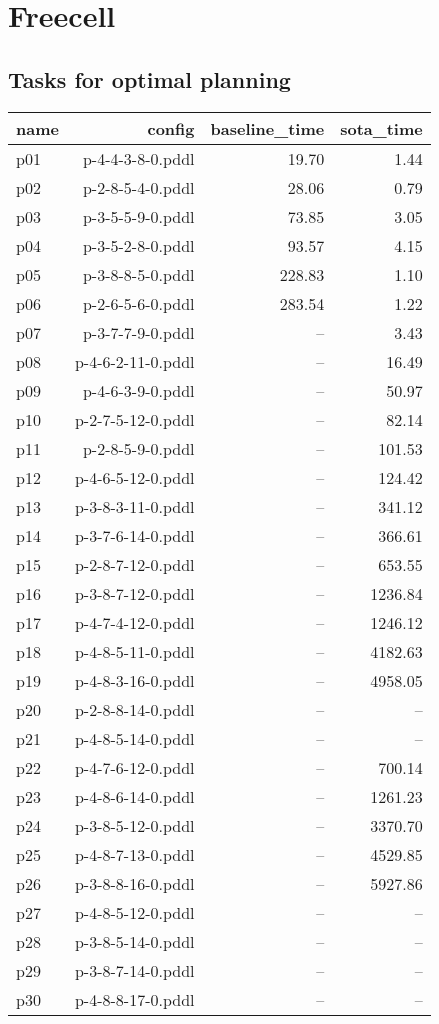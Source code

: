 \documentclass{article}
\begin{document}
                    
                \newpage \section{Freecell}
                    \subsection*{Tasks for optimal planning}
                    
                            \begin{center}
                            \scriptsize
                            \begin{tabular}{@{}l|r|r|r@{}}
                            name & config & baseline\_time & sota\_time\\\midrule
                              p01& p-4-4-3-8-0.pddl&19.70&1.44\\
  p02& p-2-8-5-4-0.pddl&28.06&0.79\\
  p03& p-3-5-5-9-0.pddl&73.85&3.05\\
  p04& p-3-5-2-8-0.pddl&93.57&4.15\\
  p05& p-3-8-8-5-0.pddl&228.83&1.10\\
  p06& p-2-6-5-6-0.pddl&283.54&1.22\\
  p07& p-3-7-7-9-0.pddl&--&3.43\\
  p08& p-4-6-2-11-0.pddl&--&16.49\\
  p09& p-4-6-3-9-0.pddl&--&50.97\\
  p10& p-2-7-5-12-0.pddl&--&82.14\\
  p11& p-2-8-5-9-0.pddl&--&101.53\\
  p12& p-4-6-5-12-0.pddl&--&124.42\\
  p13& p-3-8-3-11-0.pddl&--&341.12\\
  p14& p-3-7-6-14-0.pddl&--&366.61\\
  p15& p-2-8-7-12-0.pddl&--&653.55\\
  p16& p-3-8-7-12-0.pddl&--&1236.84\\
  p17& p-4-7-4-12-0.pddl&--&1246.12\\
  p18& p-4-8-5-11-0.pddl&--&4182.63\\
  p19& p-4-8-3-16-0.pddl&--&4958.05\\
  p20& p-2-8-8-14-0.pddl&--&--\\
  p21& p-4-8-5-14-0.pddl&--&--\\
  p22& p-4-7-6-12-0.pddl&--&700.14\\
  p23& p-4-8-6-14-0.pddl&--&1261.23\\
  p24& p-3-8-5-12-0.pddl&--&3370.70\\
  p25& p-4-8-7-13-0.pddl&--&4529.85\\
  p26& p-3-8-8-16-0.pddl&--&5927.86\\
  p27& p-4-8-5-12-0.pddl&--&--\\
  p28& p-3-8-5-14-0.pddl&--&--\\
  p29& p-3-8-7-14-0.pddl&--&--\\
  p30& p-4-8-8-17-0.pddl&--&--
                            \end{tabular}
                            \end{center}
                    
\end{document}
